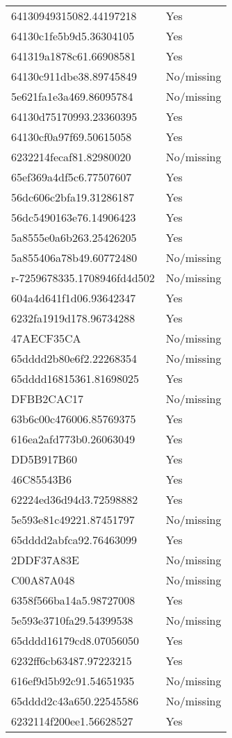 \begin{tabular}{ll}
64130949315082.44197218 & Yes \\
64130c1fe5b9d5.36304105 & Yes \\
641319a1878c61.66908581 & Yes \\
64130c911dbe38.89745849 & No/missing \\
5e621fa1e3a469.86095784 & No/missing \\
64130d75170993.23360395 & Yes \\
64130cf0a97f69.50615058 & Yes \\
6232214fecaf81.82980020 & No/missing \\
65ef369a4df5c6.77507607 & Yes \\
56dc606c2bfa19.31286187 & Yes \\
56dc5490163e76.14906423 & Yes \\
5a8555e0a6b263.25426205 & Yes \\
5a855406a78b49.60772480 & No/missing \\
r-7259678335.1708946fd4d502 & No/missing \\
604a4d641f1d06.93642347 & Yes \\
6232fa1919d178.96734288 & Yes \\
47AECF35CA & No/missing \\
65dddd2b80e6f2.22268354 & No/missing \\
65dddd16815361.81698025 & Yes \\
DFBB2CAC17 & No/missing \\
63b6c00c476006.85769375 & Yes \\
616ea2afd773b0.26063049 & Yes \\
DD5B917B60 & Yes \\
46C85543B6 & Yes \\
62224ed36d94d3.72598882 & Yes \\
5e593e81c49221.87451797 & No/missing \\
65dddd2abfca92.76463099 & Yes \\
2DDF37A83E & No/missing \\
C00A87A048 & No/missing \\
6358f566ba14a5.98727008 & Yes \\
5e593e3710fa29.54399538 & No/missing \\
65dddd16179cd8.07056050 & Yes \\
6232ff6cb63487.97223215 & Yes \\
616ef9d5b92c91.54651935 & No/missing \\
65dddd2c43a650.22545586 & No/missing \\
6232114f200ee1.56628527 & Yes \\

\end{tabular}
